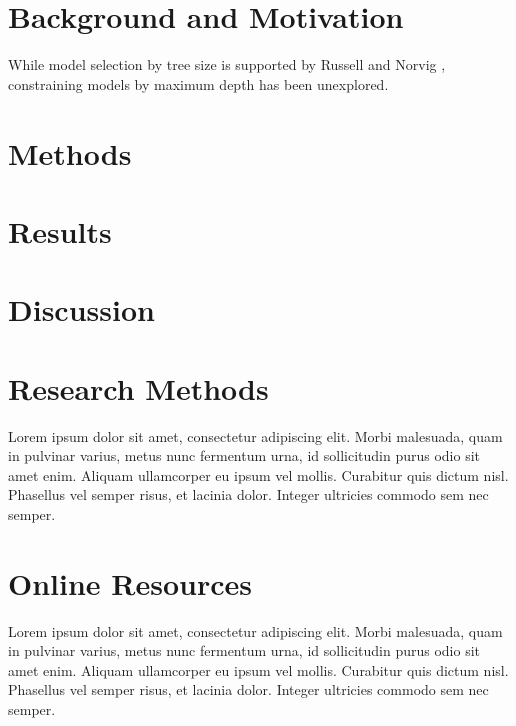 \documentclass[screen, authorversion, nonacm, sigconf]{acmart}
\begin{document}
\section{Background and Motivation}

While model selection by tree size is supported by Russell and Norvig \cite{russell_norvig_2010}, constraining models by maximum depth has been unexplored.

\section{Methods}

\section{Results}

\section{Discussion}

\begin{acks}
  
\end{acks}




\appendix

\section{Research Methods}

Lorem ipsum dolor sit amet, consectetur adipiscing elit. Morbi
malesuada, quam in pulvinar varius, metus nunc fermentum urna, id
sollicitudin purus odio sit amet enim. Aliquam ullamcorper eu ipsum
vel mollis. Curabitur quis dictum nisl. Phasellus vel semper risus, et
lacinia dolor. Integer ultricies commodo sem nec semper.

\section{Online Resources}

Lorem ipsum dolor sit amet, consectetur adipiscing elit. Morbi
malesuada, quam in pulvinar varius, metus nunc fermentum urna, id
sollicitudin purus odio sit amet enim. Aliquam ullamcorper eu ipsum
vel mollis. Curabitur quis dictum nisl. Phasellus vel semper risus, et
lacinia dolor. Integer ultricies commodo sem nec semper.
\end{document}
